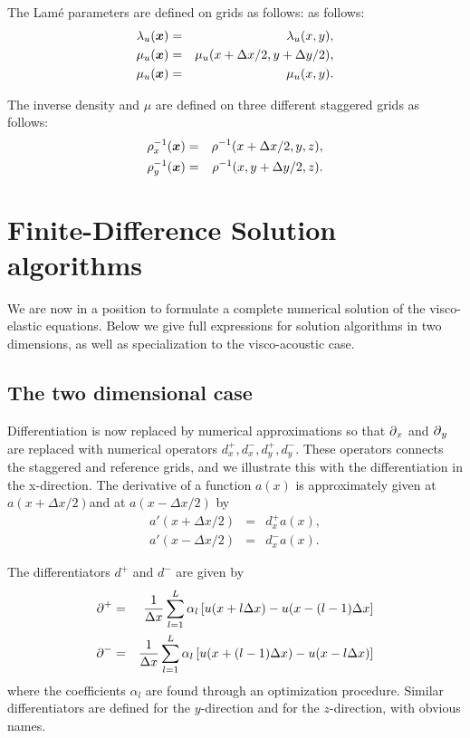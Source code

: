 \documentclass[11pt]{article}
\begin{document}
The Lam\'{e} parameters are defined on grids as follows:
as follows:
%
\begin{eqnarray}
   \lambda_u(\mbox{\boldmath $x$}) & = & \lambda_u(x,y),\\
   \mu_u(\mbox{\boldmath $x$})     & = & \mu_u(x+\Delta x/2,y+\Delta y/2), \nonumber\\
   \mu_u(\mbox{\boldmath $x$})     & = & \mu_u(x,y).
\end{eqnarray}

The inverse density and $\mu$ are defined  on three different staggered grids as follows:
\begin{eqnarray}
   \rho_x^{-1}(\mbox{\boldmath $x$}) & = & \rho^{-1}(x+\Delta x/2, y, z),       \nonumber\\
   \rho_y^{-1}(\mbox{\boldmath $x$}) & = & \rho^{-1}(x,y+\Delta y/2, z).        \nonumber
\end{eqnarray}

\section{Finite-Difference Solution algorithms}
We are now in a position to formulate a complete numerical 
solution of the visco-elastic equations.
Below we give full expressions for
solution algorithms in two dimensions, as well
as specialization to the visco-acoustic case.
\subsection{The two dimensional case}
Differentiation is now replaced by numerical approximations so 
that $\mbox{$\partial$}_x$ and $\mbox{$\partial$}_y$ 
are replaced with numerical operators $d^+_x,d^-_x,d^+_y,d^-_y$.
These operators connects the staggered and reference grids, and we 
illustrate this with the differentiation
in the x-direction.
The derivative of a function $a(x)$ is approximately given at 
$a(x+\Delta x/2)$and
at $a(x-\Delta x/2)$ by
\begin{eqnarray}
a'(x+\Delta x/2) & = & d^+_x a(x),\nonumber\\
a'(x-\Delta x/2) & = & d^-_x a(x).
\end{eqnarray}

The differentiators $d^+$ and $d^-$ are given by
\citep{Holberg1987}
%
\begin{eqnarray}
   \mbox{$\partial$}^+ & = & \frac{1}{\Delta x}\sum_{l=1}^L \alpha_l\left[u(x +l\Delta x) -
		          u(x - (l-1)\Delta x\right]\nonumber\\	
   \mbox{$\partial$}^- & = & \frac{1}{\Delta x}\sum_{l=1}^L \alpha_l\left[u(x +(l-1)\Delta x) -
					          u(x - l\Delta x)\right]
\end{eqnarray}
where the coefficients $\alpha_l$ are found through an optimization procedure.
Similar differentiators are defined for the $y$-direction and for 
the $z$-direction, with obvious names.
\end{document}
